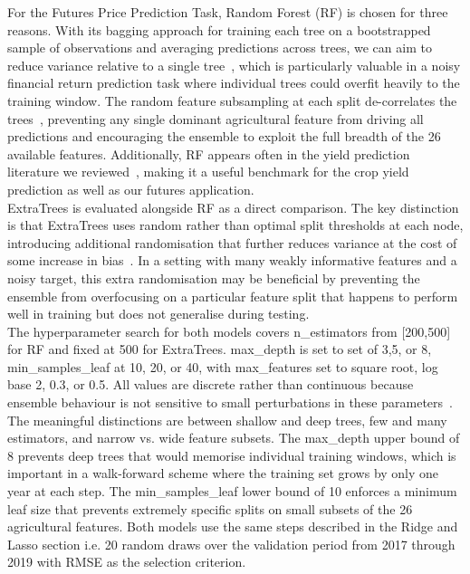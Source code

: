 \documentclass[pdflatex,sn-mathphys-num, oneside, 11pt]{sn-jnl}%
\theoremstyle{thmstyleone}%
\theoremstyle{thmstyletwo}%
\theoremstyle{thmstylethree}%
\begin{document}
For the Futures Price Prediction Task, Random Forest (RF) is chosen for three reasons. With its bagging approach for training each tree on a bootstrapped sample of observations and averaging predictions across trees, we can aim to reduce variance relative to a single tree~\cite{bib31}, which is particularly valuable in a noisy financial return prediction task where individual trees could overfit heavily to the training window. The random feature subsampling at each split de-correlates the trees~\cite{bib31}, preventing any single dominant agricultural feature from driving all predictions and encouraging the ensemble to exploit the full breadth of the 26 available features. Additionally, RF appears often in the yield prediction literature we reviewed~\cite{bib14,bib16,bib17}, making it a useful benchmark for the crop yield prediction as well as our futures application.\\

ExtraTrees is evaluated alongside RF as a direct comparison. The key distinction is that ExtraTrees uses random rather than optimal split thresholds at each node, introducing additional randomisation that further reduces variance at the cost of some increase in bias~\cite{bib32}. In a setting with many weakly informative features and a noisy target, this extra randomisation may be beneficial by preventing the ensemble from overfocusing on a particular feature split that happens to perform well in training but does not generalise during testing.\\

The hyperparameter search for both models covers n\_estimators from [200,500] for RF and fixed at 500 for ExtraTrees. max\_depth is set to set of 3,5, or 8, min\_samples\_leaf at 10, 20, or 40, with max\_features set to square root, log base 2, 0.3, or 0.5. All values are discrete rather than continuous because ensemble behaviour is not sensitive to small perturbations in these parameters~\cite{bib34}. The meaningful distinctions are between shallow and deep trees, few and many estimators, and narrow vs. wide feature subsets. The max\_depth upper bound of 8 prevents deep trees that would memorise individual training windows, which is important in a walk-forward scheme where the training set grows by only one year at each step. The min\_samples\_leaf lower bound of 10 enforces a minimum leaf size that prevents extremely specific splits on small subsets of the 26 agricultural features. Both models use the same steps described in the Ridge and Lasso section i.e. 20 random draws over the validation period from 2017 through 2019 with RMSE as the selection criterion.\\
\end{document}
